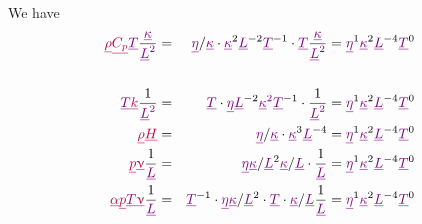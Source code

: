\documentclass[a4paper,11pt]{article}
\newcommand{\nn}{\nonumber}
\begin{document}
We have 
\begin{eqnarray}
{\color{purple} \underline{\rho}} 
{\color{purple} \underline{C_p}} 
{\color{violet} \underline{T}}
\frac{ \color{violet} \underline{\kappa}  }{\color{violet} \underline{L}^2}
&=& {\color{violet} \underline{\eta}} / {\color{violet} \underline{\kappa}}
\cdot 
{\color{violet} \underline{\kappa}}^2 {\color{violet}  \underline{L}}^{-2}
{\color{violet} \underline{T}}^{-1}
\cdot
{\color{violet} \underline{T}}
\frac{ \color{violet} \underline{\kappa}  }{\color{violet} \underline{L}^2} 
=
{\color{violet} \underline{\eta}}^1
{\color{violet} \underline{\kappa}}^2
{\color{violet} \underline{L}}^{-4}
{\color{violet} \underline{T}}^{0}
\nn\\
\nn\\
{\color{violet} \underline{T}} {\color{purple} \underline{k}} 
\frac{1}{\color{violet} \underline{L}^2}
&=& 
{\color{violet} \underline{T}} 
\cdot
{\color{violet} \underline{\eta}} {\color{violet} \underline{L}}^{-2} 
{\color{violet} \underline{\kappa}^2 \underline{T}}^{-1}
\cdot 
\frac{1}{\color{violet} \underline{L}^2}
=
{\color{violet} \underline{\eta}}^1
{\color{violet} \underline{\kappa}}^2
{\color{violet} \underline{L}}^{-4}
{\color{violet} \underline{T}}^{0}
\nn\\
{\color{purple} \underline{\rho}} {\color{purple} \underline{H}}
&=& 
{\color{violet} \underline{\eta}}  / {\color{violet} \underline{\kappa}}
\cdot 
{\color{violet} \underline{\kappa}}^3 {\color{violet} \underline{L}}^{-4}
=
{\color{violet} \underline{\eta}}^1
{\color{violet} \underline{\kappa}}^2
{\color{violet} \underline{L}}^{-4}
{\color{violet} \underline{T}}^0
\nn\\
{\color{purple} \underline{p}} {\color{purple} \underline{\upnu}} 
\frac{1}{\color{violet} \underline{L}}
&=& 
{\color{violet} \underline{\eta}}   {\color{violet} \underline{\kappa}} / {\color{violet} \underline{L}}^2
{\color{violet} \underline{\kappa}} / {\color{violet} \underline{L}}
\cdot
\frac{1}{\color{violet} \underline{L}}
=
{\color{violet} \underline{\eta}}^1
{\color{violet} \underline{\kappa}}^2
{\color{violet} \underline{L}}^{-4}
{\color{violet} \underline{T}}^0
\nn\\
{\color{purple} \underline{\alpha}}
{\color{purple} \underline{p}}
{\color{violet} \underline{T}}
{\color{purple} \underline{\upnu}}
\frac{1}{\color{violet} \underline{L}}
&=&
{\color{violet} \underline{T}}^{-1}
\cdot
{\color{violet} \underline{\eta}} {\color{violet} \underline{\kappa}} / {\color{violet} \underline{L}}^2
\cdot
{\color{violet} \underline{T}}
\cdot
{\color{violet} \underline{\kappa}}/{\color{violet} \underline{L}}
\frac{1}{\color{violet} \underline{L}}
=
{\color{violet} \underline{\eta}}^1
{\color{violet} \underline{\kappa}}^2
{\color{violet} \underline{L}}^{-4}
{\color{violet} \underline{T}}^0
\end{eqnarray}
\end{document}
